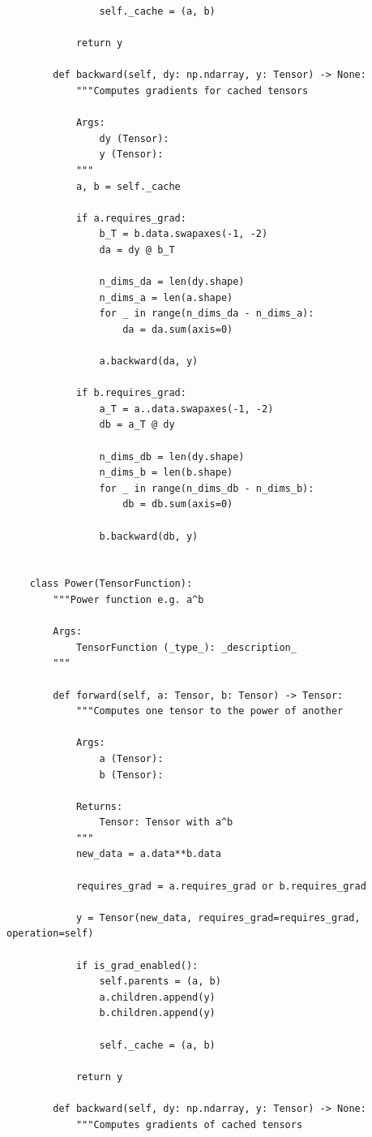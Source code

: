 \documentclass{article}
\begin{document}
\begin{verbatim}
                self._cache = (a, b)

            return y

        def backward(self, dy: np.ndarray, y: Tensor) -> None:
            """Computes gradients for cached tensors

            Args:
                dy (Tensor):
                y (Tensor):
            """
            a, b = self._cache

            if a.requires_grad:
                b_T = b.data.swapaxes(-1, -2)
                da = dy @ b_T

                n_dims_da = len(dy.shape)
                n_dims_a = len(a.shape)
                for _ in range(n_dims_da - n_dims_a):
                    da = da.sum(axis=0)

                a.backward(da, y)

            if b.requires_grad:
                a_T = a..data.swapaxes(-1, -2)
                db = a_T @ dy

                n_dims_db = len(dy.shape)
                n_dims_b = len(b.shape)
                for _ in range(n_dims_db - n_dims_b):
                    db = db.sum(axis=0)

                b.backward(db, y)


    class Power(TensorFunction):
        """Power function e.g. a^b

        Args:
            TensorFunction (_type_): _description_
        """

        def forward(self, a: Tensor, b: Tensor) -> Tensor:
            """Computes one tensor to the power of another

            Args:
                a (Tensor):
                b (Tensor):

            Returns:
                Tensor: Tensor with a^b
            """
            new_data = a.data**b.data

            requires_grad = a.requires_grad or b.requires_grad

            y = Tensor(new_data, requires_grad=requires_grad, operation=self)

            if is_grad_enabled():
                self.parents = (a, b)
                a.children.append(y)
                b.children.append(y)

                self._cache = (a, b)

            return y

        def backward(self, dy: np.ndarray, y: Tensor) -> None:
            """Computes gradients of cached tensors


\end{verbatim}
\end{document}
